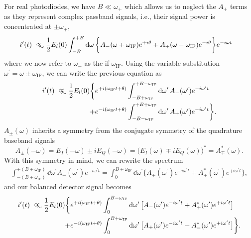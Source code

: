 For real photodiodes, we have $B\ll\omega_+$ which allows us to neglect the $A_+$ terms as they represent complex passband signals, i.e., their signal power is concentrated at $\pm\omega_+$,
\begin{align}
    i^\prime(t)
    &\approxprop
    \frac{1}{2}
    E_l(0)
    \int_{-B}^{+B}\dd{\omega}
    \biggl\{
        A_-(\omega+\omega_\text{IF})e^{+i\theta}
        +
        A_+(\omega-\omega_\text{IF})e^{-i\theta}
    \biggr\}
    e^{-i\omega t}
\end{align}
where we now refer to $\omega_-$ as the \gls{if} $\omega_\text{IF}$.
Using the variable substitution $\omega^\prime=\omega\pm\omega_\text{IF}$, we can write the previous equation as
\begin{align}
    i^\prime(t)
    \approxprop
    \frac{1}{2}
    E_l(0)
    \biggl\{
        &e^{+i(\omega_\text{IF}t+\theta)}
        \int_{-B+\omega_\text{IF}}^{+B-\omega_\text{IF}}\dd{\omega^\prime}
            A_-(\omega^\prime)e^{-i\omega^\prime t}\\
        +
        &e^{-i(\omega_\text{IF}t+\theta)}
        \int_{-B-\omega_\text{IF}}^{+B+\omega_\text{IF}}\dd{\omega^\prime}
            A_+(\omega^\prime)e^{-i\omega^\prime t}
    \biggr\}.
\end{align}
$A_\pm(\omega)$ inherits a symmetry from the conjugate symmetry of the quadrature baseband signals
\begin{equation}
    A_\pm(-\omega)
    =
    E_I(-\omega)\pm iE_Q(-\omega)
    =
    \bigl(
    E_I(\omega)\mp iE_Q(\omega)
    \bigr)^*
    =
    A_\mp^*(\omega)
    .
\end{equation}
With this symmetry in mind, we can rewrite the spectrum
\begin{align}
    \int_{-(B\mp\omega_\text{IF})}^{+(B\mp\omega_\text{IF})}\dd{\omega^\prime}
    A_\mp(\omega^\prime)e^{-i\omega^\prime t}
    =
    \int_0^{B\mp\omega_\text{IF}}\dd{\omega^\prime}
    \bigg\{
        A_\mp(\omega^\prime)e^{-i\omega^\prime t}
        +
        A_\pm^*(\omega^\prime)e^{+i\omega^\prime t}
    \bigg\},
\end{align}
and our balanced detector signal becomes
\begin{align}
    i^\prime(t)
    \approxprop
    \frac{1}{2}E_l(0)
    \biggl\{
        &e^{+i(\omega_\text{IF}t+\theta)}
        \int_{0}^{B-\omega_\text{IF}}\dd{\omega^\prime}
            \bigl[
                A_-(\omega^\prime)e^{-i\omega^\prime t}
                +
                A_+^*(\omega^\prime)e^{+i\omega^\prime t}
            \bigr]\\
            +
        &e^{-i(\omega_\text{IF}t+\theta)}
        \int_{0}^{B+\omega_\text{IF}}\dd{\omega^\prime}
            \bigl[
                A_+(\omega^\prime)e^{-i\omega^\prime t}
                +
                A_-^*(\omega^\prime)e^{+i\omega^\prime t}
            \bigr]
    \biggr\}.
\end{align}

